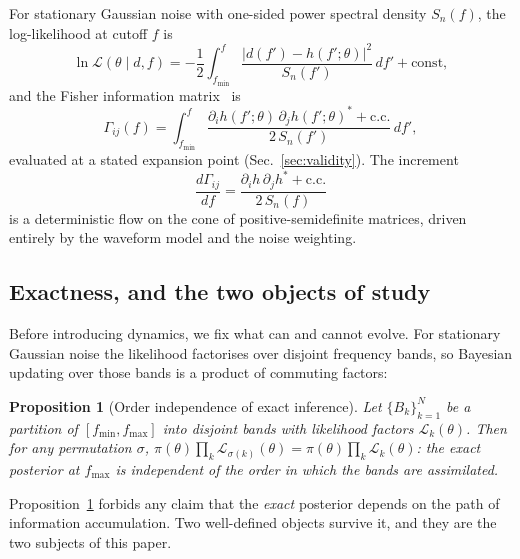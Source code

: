 \documentclass[twocolumn,prd,showpacs,superscriptaddress]{revtex4-2}
\newtheorem{proposition}{Proposition}
\newcommand{\fmin}{f_{\text{min}}}
\newcommand{\fmax}{f_{\text{max}}}
\newcommand{\secref}[1]{Sec.~\ref{sec:#1}}
\begin{document}
For stationary Gaussian noise with one-sided power spectral density
$S_n(f)$, the log-likelihood at cutoff $f$ is
\begin{equation}
\ln \mathcal{L}(\theta \mid d, f) = -\frac12 \int_{\fmin}^{f}
\frac{|d(f') - h(f'; \theta)|^2}{S_n(f')}\,df' + \text{const},
\label{eq:likelihood}
\end{equation}
and the Fisher information
matrix~\cite{cutler1994fisher,vallisneri2008fisher} is
\begin{equation}
\Gamma_{ij}(f) = \int_{\fmin}^{f}
\frac{\partial_i h(f';\theta)\,\partial_j h(f';\theta)^{*} + \text{c.c.}}
{2\,S_n(f')}\,df',
\label{eq:fisher}
\end{equation}
evaluated at a stated expansion point (\secref{validity}).  The
increment
\begin{equation}
\frac{d\Gamma_{ij}}{df} =
\frac{\partial_i h\,\partial_j h^{*} + \text{c.c.}}{2\,S_n(f)}
\label{eq:fisher_flow}
\end{equation}
is a deterministic flow on the cone of positive-semidefinite matrices,
driven entirely by the waveform model and the noise weighting.

\subsection{Exactness, and the two objects of study}
\label{sec:exactness}

Before introducing dynamics, we fix what can and cannot evolve.  For
stationary Gaussian noise the likelihood factorises over disjoint
frequency bands, so Bayesian updating over those bands is a product of
commuting factors:

\begin{proposition}[Order independence of exact inference]
\label{prop:exact}
Let $\{B_k\}_{k=1}^{N}$ be a partition of $[\fmin,\fmax]$ into disjoint
bands with likelihood factors $\mathcal{L}_k(\theta)$.  Then for any
permutation $\sigma$,
$\pi(\theta)\prod_k \mathcal{L}_{\sigma(k)}(\theta)
= \pi(\theta)\prod_k \mathcal{L}_{k}(\theta)$:
the exact posterior at $\fmax$ is independent of the order in which the
bands are assimilated.
\end{proposition}

Proposition~\ref{prop:exact} forbids any claim that the \emph{exact}
posterior depends on the path of information accumulation.  Two
well-defined objects survive it, and they are the two subjects of this
paper.
\end{document}
